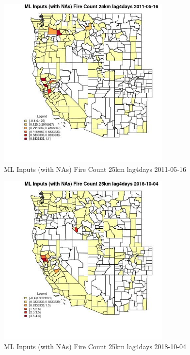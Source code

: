 \begin{figure} 
\centering  
\includegraphics[width=0.77\textwidth]{Code_Outputs/Report_ML_input_PM25_Step4_part_f_de_duplicated_aveswNAs_CountyFire_Count_25km_lag4daysMean2011-05-16.jpg} 
\caption{\label{fig:Report_ML_input_PM25_Step4_part_f_de_duplicated_aveswNAsCountyFire_Count_25km_lag4daysMean2011-05-16}ML Inputs (with NAs) Fire Count 25km lag4days 2011-05-16} 
\end{figure} 
 

\clearpage 

\begin{figure} 
\centering  
\includegraphics[width=0.77\textwidth]{Code_Outputs/Report_ML_input_PM25_Step4_part_f_de_duplicated_aveswNAs_CountyFire_Count_25km_lag4daysMean2018-10-04.jpg} 
\caption{\label{fig:Report_ML_input_PM25_Step4_part_f_de_duplicated_aveswNAsCountyFire_Count_25km_lag4daysMean2018-10-04}ML Inputs (with NAs) Fire Count 25km lag4days 2018-10-04} 
\end{figure} 
 

